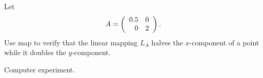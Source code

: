 \documentclass{ximera}
\begin{document}
\begin{computerExercise} \label{c4.3.13}
Let
\[
A = \left(\begin{array}{rr} 0.5 & 0\\ 0 &2\end{array}\right).
\]
Use {\sf map} to verify that the linear mapping $L_A$ halves
the $x$-component of a point while it doubles the $y$-component.

\begin{solution}
Computer experiment.

\end{solution}
\end{computerExercise}
\end{document}
